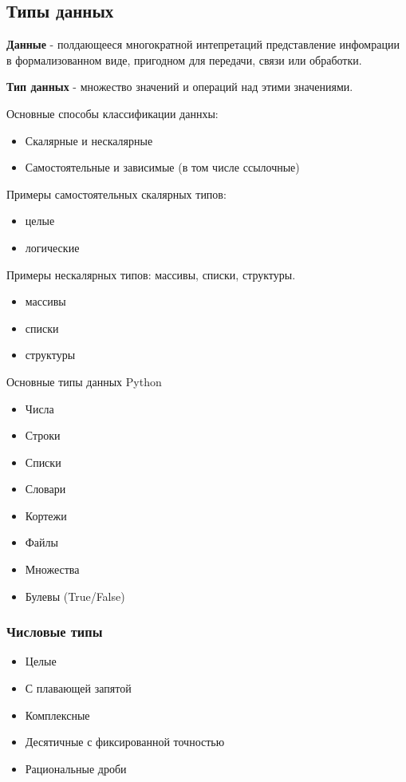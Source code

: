\subsection{Типы данных}

\begin{definition}
  \textbf{Данные} - полдающееся многократной интепретаций представление инфомрации в формализованном виде, пригодном для передачи, связи или обработки.
\end{definition}

\begin{definition}
  \textbf{Тип данных} - множество значений и операций над этими значениями.
\end{definition}

Основные способы классификации даннхы:
\begin{itemize}
  \item Скалярные и нескалярные
  \item Самостоятельные и зависимые (в том числе ссылочные)
\end{itemize}

Примеры самостоятельных скалярных типов: 
\begin{itemize}
  \item целые
  \item логические
\end{itemize}

Примеры нескалярных типов: массивы, списки, структуры.
\begin{itemize}
  \item массивы
  \item списки
  \item структуры
\end{itemize}

Основные типы данных Python
\begin{itemize}
  \item Числа
  \item Строки
  \item Списки
  \item Словари
  \item Кортежи
  \item Файлы
  \item Множества
  \item Булевы (True/False)
\end{itemize}

\subsubsection{Числовые типы}
\begin{itemize}
  \item Целые
  \item С плавающей запятой
  \item Комплексные
  \item Десятичные с фиксированной точностью
  \item Рациональные дроби
\end{itemize}

